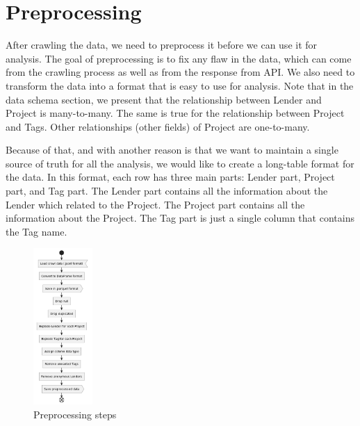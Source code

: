 \section{Preprocessing}

After crawling the data, we need to preprocess it before we can use it for analysis.
The goal of preprocessing is to fix any flaw in the data, which can come from the crawling process as well as from the response from API.
We also need to transform the data into a format that is easy to use for analysis.
Note that in the data schema section, we present that the relationship between Lender and Project is many-to-many.
The same is true for the relationship between Project and Tags.
Other relationships (other fields) of Project are one-to-many.

Because of that, and with another reason is that we want to maintain a single source of truth for all the analysis,
we would like to create a long-table format for the data.
In this format, each row has three main parts: Lender part, Project part, and Tag part.
The Lender part contains all the information about the Lender which related to the Project.
The Project part contains all the information about the Project.
The Tag part is just a single column that contains the Tag name.


\begin{figure}[H]
	\centering
	\includegraphics[width=0.2\textwidth]{images/graphuml/preprocessing.png}
	\caption{Preprocessing steps}
	\label{fig:preprocessing}
\end{figure}

